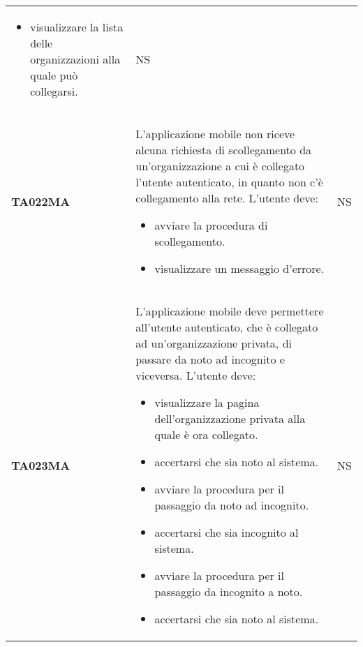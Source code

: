 \documentclass[../../piano-di-qualifica.tex]{subfiles}
\begin{document}
\begin{longtable}[H]{>{\centering\bfseries}m{3cm} >{}m{10cm} >{\centering\arraybackslash}m{3cm}}
\begin{itemize}
    \item visualizzare la lista delle organizzazioni alla quale può collegarsi.
  \end{itemize}
                    & NS                                                                                                                                                                                                                                                               \\
  TA022MA           & L'applicazione mobile non riceve alcuna richiesta di scollegamento da un'organizzazione a cui è collegato l'utente autenticato, in quanto non c'è collegamento alla rete. \newline
  L'utente deve:
  \begin{itemize}
    \item avviare la procedura di scollegamento.
    \item visualizzare un messaggio d'errore.
  \end{itemize}
                    & NS                                                                                                                                                                                                                                                               \\
  TA023MA           & L'applicazione mobile deve permettere all'utente autenticato, che è collegato ad un'organizzazione privata, di passare da noto ad incognito e viceversa. \newline
  L'utente deve:
  \begin{itemize}
    \item visualizzare la pagina dell'organizzazione privata alla quale è ora collegato.
    \item accertarsi che sia noto al sistema.
    \item avviare la procedura per il passaggio da noto ad incognito.
    \item accertarsi che sia incognito al sistema.
    \item avviare la procedura per il passaggio da incognito a noto.
    \item accertarsi che sia noto al sistema.
  \end{itemize}
                    & NS                                                                                                                                                                                                                                                               \\

\end{longtable}
\end{document}
